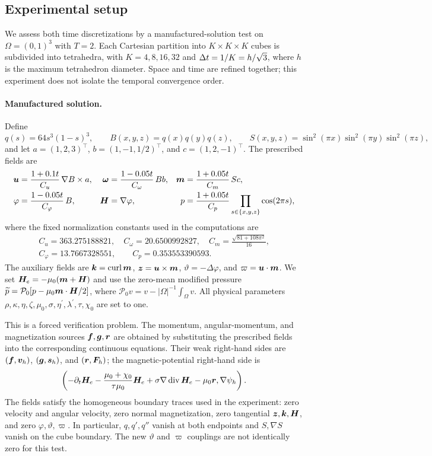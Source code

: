 \subsection{Experimental setup}
\label{subsec:experiment-setup}
We assess both time discretizations by a manufactured-solution test
on $\Omega=(0,1)^3$ with $T=2$. Each Cartesian partition into
$K\times K\times K$ cubes is subdivided into tetrahedra, with
$K=4,8,16,32$ and $\Delta t=1/K=h/\sqrt{3}$, where $h$ is the maximum
tetrahedron diameter. Space and time are refined together;
this experiment does not isolate the temporal convergence order.

\paragraph{Manufactured solution.}
Define
\[
q(s)=64s^3(1-s)^3,\qquad
B(x,y,z)=q(x)q(y)q(z),\qquad
S(x,y,z)=\sin^2(\pi x)\sin^2(\pi y)\sin^2(\pi z),
\]
and let $a=(1,2,3)^\intercal$, $b=(1,-1,1/2)^\intercal$, and
$c=(1,2,-1)^\intercal$. The prescribed fields are
\begin{align*}
\boldsymbol u&=\frac{1+0.1t}{C_u}\,\nabla B\times a,
&\boldsymbol\omega&=\frac{1-0.05t}{C_\omega}\,B b,
&\boldsymbol m&=\frac{1+0.05t}{C_m}\,S c,\\
\varphi&=\frac{1-0.05t}{C_\varphi}\,B,
&\boldsymbol H&=\nabla\varphi,
&p&=\frac{1+0.05t}{C_p}\prod_{s\in\{x,y,z\}}\cos(2\pi s),
\end{align*}
where the fixed normalization constants used in the computations are
\begin{gather*}
C_u=363.275188821,\quad C_\omega=20.6500992827,\quad
C_m=\frac{\sqrt{81+108\pi^2}}{16},\\
C_\varphi=13.7667328551,\qquad C_p=0.353553390593.
\end{gather*}
The auxiliary fields are $\boldsymbol k=\operatorname{curl}\boldsymbol m$, $\boldsymbol z=\boldsymbol u\times\boldsymbol m$,
$\vartheta=-\Delta\varphi$, and $\varpi=\boldsymbol u\cdot\boldsymbol m$.
We set $\boldsymbol H_e=-\mu_0(\boldsymbol m+\boldsymbol H)$ and use the zero-mean modified
pressure $\widetilde p=\mathcal P_0[p-\mu_0\boldsymbol m\cdot\boldsymbol H/2]$, where
$\mathcal P_0v=v-|\Omega|^{-1}\int_\Omega v$.
All physical parameters $\rho,\kappa,\eta,\zeta,\mu_0,\sigma,
\eta^\prime,\lambda^\prime,\tau,\chi_0$ are set to one.

This is a forced verification problem. The momentum, angular-momentum,
and magnetization sources $\boldsymbol f,\boldsymbol g,\boldsymbol r$ are obtained by substituting
the prescribed fields into the corresponding continuous equations.
Their weak right-hand sides are $(\boldsymbol f,\boldsymbol v_h)$,
$(\boldsymbol g,\boldsymbol s_h)$, and $(\boldsymbol r,\boldsymbol F_h)$; the magnetic-potential
right-hand side is
\[
\left(-\partial_t\boldsymbol H_e
-\frac{\mu_0+\chi_0}{\tau\mu_0}\boldsymbol H_e
+\sigma\nabla\operatorname{div}\boldsymbol H_e-\mu_0\boldsymbol r,\nabla\psi_h\right).
\]
The fields satisfy the homogeneous boundary traces used in the experiment:
zero velocity and angular velocity, zero normal magnetization,
zero tangential $\boldsymbol z,\boldsymbol k,\boldsymbol H$, and zero
$\varphi,\vartheta,\varpi$. In particular, $q,q',q''$ vanish at both
endpoints and $S,\nabla S$ vanish on the cube boundary. The new
$\vartheta$ and $\varpi$ couplings are not identically zero for this test.

